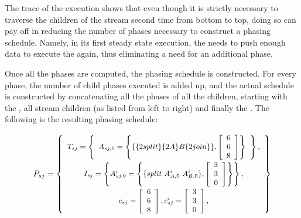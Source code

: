 The trace of the execution shows that even though it is strictly
necessary to traverse the children of the stream second time from
bottom to top, doing so can pay off in reducing the number of
phases necessary to construct a phasing schedule.  Namely, in its
first steady state execution, the {\splitter} needs to push enough
data to execute the {\joiner} again, thus eliminating a need for an
additional phase.

Once all the phases are computed, the phasing schedule is
constructed. For every phase, the number of child phases executed
is added up, and the actual schedule is constructed by
concatenating all the phases of all the children, starting with
the {\splitter}, all stream children (as listed from left to right)
and finally the {\joiner}. The following is the resulting phasing
schedule:

\begin{displaymath} \small
P_{sj} = \left\{
\begin{array}{c}
T_{sj} = \left\{
\begin{array}{c}
A_{sj,0} = \left\{ \{\{2 split\}\{2A\}B\{2 join\}\}, \left[\begin{array}{c} 6 \\ 6 \\ 8 \end{array}\right]\right\} \\
\end{array}\right\}, \\
I_{sj} = \left\{ A^i_{sj,0} = \left\{
\{split\ A^i_{A,0}\ A^i_{B,0}\}, \left[\begin{array}{c} 3 \\ 3 \\ 0 \\
\end{array}\right]\right\}
\right\}, \\
c_{sj} = \left[ \begin{array}{c} 6 \\ 6 \\ 8 \end{array} \right],
c^i_{sj} = \left[ \begin{array}{c} 3 \\ 3 \\ 0 \end{array}
\right],
\end{array}
\right\}
\end{displaymath}

\subsubsection{\feedbackloop}

